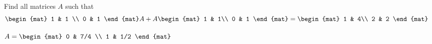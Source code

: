 
\begin{Exercise}[
name={},
title={}, 
difficulty=0,
origin={\cite{BS}}]
Find all matrices $A$ such that
\[
\begin{mat}
1 & 1 \\
0 & 1 
\end{mat}A+
A\begin{mat}
1 & 1\\
0 & 1
\end{mat}
=
\begin{mat}
1 & 4\\
2 & 2
\end{mat}
\]
\end{Exercise}

\begin{Answer}
$
A=\begin{mat}
0 & 7/4 \\
1 & 1/2
\end{mat}$
\end{Answer}
